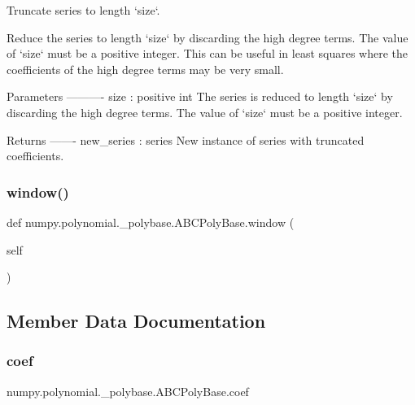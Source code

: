\begin{DoxyVerb}Truncate series to length `size`.

Reduce the series to length `size` by discarding the high
degree terms. The value of `size` must be a positive integer. This
can be useful in least squares where the coefficients of the
high degree terms may be very small.

Parameters
----------
size : positive int
    The series is reduced to length `size` by discarding the high
    degree terms. The value of `size` must be a positive integer.

Returns
-------
new_series : series
    New instance of series with truncated coefficients.\end{DoxyVerb}
 \mbox{\label{classnumpy_1_1polynomial_1_1__polybase_1_1ABCPolyBase_a49f06edc861899d6a6aba226255fd445}} 
\subsubsection{\texorpdfstring{window()}{window()}}
{\footnotesize\ttfamily def numpy.\+polynomial.\+\_\+polybase.\+A\+B\+C\+Poly\+Base.\+window (\begin{DoxyParamCaption}\item[{}]{self }\end{DoxyParamCaption})}



\subsection{Member Data Documentation}
\mbox{\label{classnumpy_1_1polynomial_1_1__polybase_1_1ABCPolyBase_abc32ea31245612c296b11a3dcca1e922}} 
\subsubsection{\texorpdfstring{coef}{coef}}
{\footnotesize\ttfamily numpy.\+polynomial.\+\_\+polybase.\+A\+B\+C\+Poly\+Base.\+coef}

